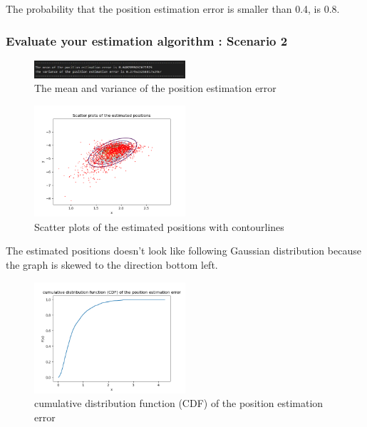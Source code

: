 \documentclass[a4paper]{article}
\begin{document}
The probability that the position estimation error is smaller than 0.4, is 0.8.

\clearpage
\subsubsection{Evaluate your estimation algorithm : Scenario 2}
\begin{figure}[h]
	\begin{center}
		\includegraphics[width=0.5\textwidth]{mean_variance_error2.jpg}
		\caption{The mean and variance of the position estimation error}
	\end{center}
\end{figure}
\begin{figure}[h]
	\begin{center}
		\includegraphics[width=0.5\textwidth]{plotcon2.png}
		\caption{Scatter plots of the estimated positions with contourlines}
	\end{center}
\end{figure}
The estimated positions doesn't look like following Gaussian distribution because the graph is skewed to the direction bottom left.
\begin{figure}[h]
	\begin{center}		
		\includegraphics[width=0.5\textwidth]{CDF2.png}
		\caption{cumulative distribution function (CDF) of the position estimation error}
	\end{center}
\end{figure}
\end{document}
